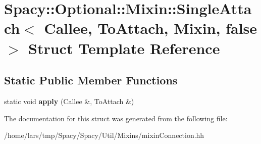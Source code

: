 \hypertarget{structSpacy_1_1Optional_1_1Mixin_1_1SingleAttach_3_01Callee_00_01ToAttach_00_01Mixin_00_01false_01_4}{}\section{Spacy\+:\+:Optional\+:\+:Mixin\+:\+:Single\+Attach$<$ Callee, To\+Attach, Mixin, false $>$ Struct Template Reference}
\label{structSpacy_1_1Optional_1_1Mixin_1_1SingleAttach_3_01Callee_00_01ToAttach_00_01Mixin_00_01false_01_4}
\subsection*{Static Public Member Functions}
\begin{DoxyCompactItemize}
\item 
static void {\bfseries apply} (Callee \&, To\+Attach \&)\hypertarget{structSpacy_1_1Optional_1_1Mixin_1_1SingleAttach_3_01Callee_00_01ToAttach_00_01Mixin_00_01false_01_4_a92ac7afd81a8e070f3b5da787b0c177e}{}\label{structSpacy_1_1Optional_1_1Mixin_1_1SingleAttach_3_01Callee_00_01ToAttach_00_01Mixin_00_01false_01_4_a92ac7afd81a8e070f3b5da787b0c177e}

\end{DoxyCompactItemize}


The documentation for this struct was generated from the following file\+:\begin{DoxyCompactItemize}
\item 
/home/lars/tmp/\+Spacy/\+Spacy/\+Util/\+Mixins/mixin\+Connection.\+hh\end{DoxyCompactItemize}
